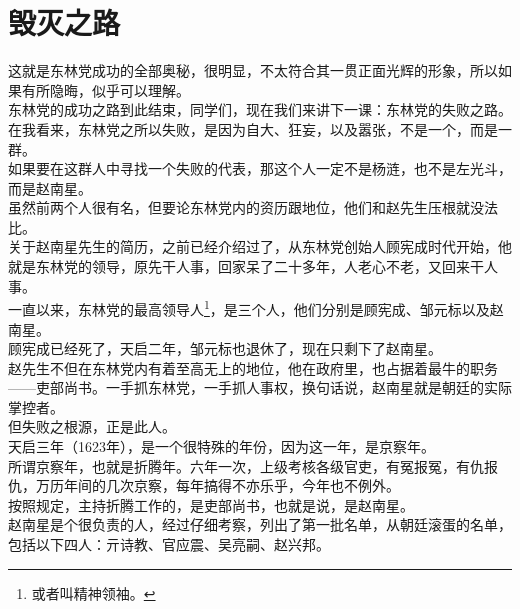 \section{毁灭之路}
\ifnum{}
	\begin{multicols}{\theparacolNo}
\fi
这就是东林党成功的全部奥秘，很明显，不太符合其一贯正面光辉的形象，所以如果有所隐晦，似乎可以理解。\\

东林党的成功之路到此结束，同学们，现在我们来讲下一课：东林党的失败之路。\\

在我看来，东林党之所以失败，是因为自大、狂妄，以及嚣张，不是一个，而是一群。\\

如果要在这群人中寻找一个失败的代表，那这个人一定不是杨涟，也不是左光斗，而是赵南星。\\

虽然前两个人很有名，但要论东林党内的资历跟地位，他们和赵先生压根就没法比。\\

关于赵南星先生的简历，之前已经介绍过了，从东林党创始人顾宪成时代开始，他就是东林党的领导，原先干人事，回家呆了二十多年，人老心不老，又回来干人事。\\

一直以来，东林党的最高领导人\footnote{或者叫精神领袖。}，是三个人，他们分别是顾宪成、邹元标以及赵南星。\\

顾宪成已经死了，天启二年，邹元标也退休了，现在只剩下了赵南星。\\

赵先生不但在东林党内有着至高无上的地位，他在政府里，也占据着最牛的职务——吏部尚书。一手抓东林党，一手抓人事权，换句话说，赵南星就是朝廷的实际掌控者。\\

但失败之根源，正是此人。\\

天启三年（1623年），是一个很特殊的年份，因为这一年，是京察年。\\

所谓京察年，也就是折腾年。六年一次，上级考核各级官吏，有冤报冤，有仇报仇，万历年间的几次京察，每年搞得不亦乐乎，今年也不例外。\\

按照规定，主持折腾工作的，是吏部尚书，也就是说，是赵南星。\\

赵南星是个很负责的人，经过仔细考察，列出了第一批名单，从朝廷滚蛋的名单，包括以下四人：亓诗教、官应震、吴亮嗣、赵兴邦。\\


\end{multicols}
